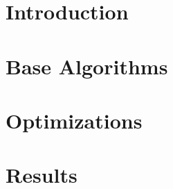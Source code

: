 \chapter{Introduction}




\chapter{Base Algorithms}




\chapter{Optimizations}



\chapter{Results}


